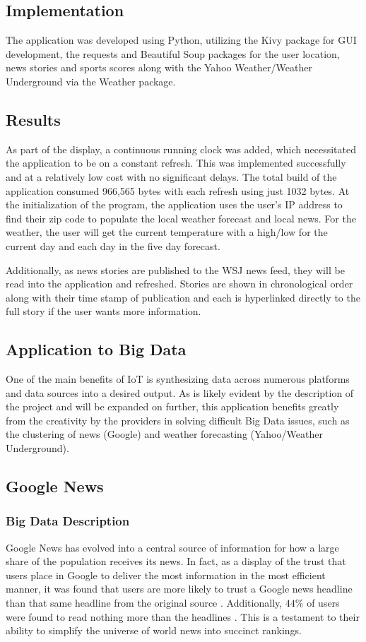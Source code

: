 \documentclass[sigconf]{acmart}
\begin{document}
\subsection{Implementation}
The application was developed using Python, utilizing the Kivy package for GUI development, the requests and Beautiful Soup packages for the user location, news stories and sports scores along with the  Yahoo Weather/Weather Underground via the Weather package. 

\subsection{Results}
As part of the display, a continuous running clock was added, which necessitated the application to be on a constant refresh. This was implemented successfully and at a relatively low cost with no significant delays. The total build of the application consumed 966,565 bytes with each refresh using just 1032 bytes. 
At the initialization of the program, the application uses the user's IP address to find their zip code to populate the local weather forecast and local news. For the weather, the user will get the current temperature with a high/low for the current day and each day in the five day forecast.

Additionally, as news stories are published to the WSJ news feed, they will be read into the application and refreshed. Stories are shown in chronological order along with their time stamp of publication and each is hyperlinked directly to the full story if the user wants more information. 

\subsection{Application to Big Data}
One of the main benefits of IoT is synthesizing data across numerous platforms and data sources into a desired output. As is likely evident by the description of the project and will be expanded on further, this application benefits greatly from the creativity by the providers in solving difficult Big Data issues, such as the  clustering of news (Google) and weather forecasting (Yahoo/Weather Underground). 

\subsection{Google News}
\subsubsection{Big Data Description}
Google News has evolved into a central source of information for how a large share of the population receives its news. In fact, as a display of the trust that users place in Google to deliver the most information in the most efficient manner, it was found that users are more likely to trust a Google news headline than that same headline from the original source \cite{edelman}. Additionally, $44\%$ of users were found to read nothing more than the headlines \cite{googleheadlines}. This is a testament to their ability to simplify the universe of world news into succinct rankings. 
\end{document}
